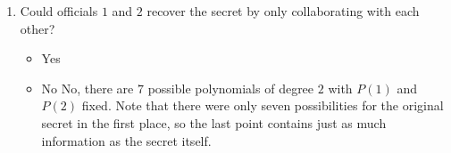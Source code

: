 \documentclass[11pt, preview]{standalone} %
\begin{document}
\begin{enumerate}
\begin{enumerate}
 \item Could officials $1$ and $2$ recover the secret by only collaborating with each other?
 \begin{Choices}
\begin{itemize}
\FalseChoice\item Yes
\TrueChoice\item No
\Solution No, there are $7$ possible polynomials of degree $2$ with $P(1)$ and $P(2)$ fixed. Note that there were only seven possibilities for the original secret in the first place, so the last point contains just as much information as the secret itself.
\end{itemize}
\end{Choices}
 
\end{enumerate}

\end{enumerate}
\end{document}
